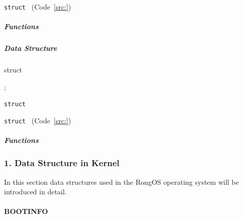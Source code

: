 \documentclass{swfcthesis}
\begin{document}
\texttt{struct } (Code~\ref{src:})

\subparagraph{ Functions}

\begin{description}
  
\item[\texttt{}]
\item[\texttt{}]
  
\end{description}




\subsubsection{}
\label{sec:}


  
\subparagraph{Data Structure}

\paragraph{}

\begin{listing}[H]
  \begin{codeblock}
\begin{ccode}
struct 
{ 
  
};
\end{ccode}
  \end{codeblock}
  \caption{\texttt{struct }}\label{src:}
\end{listing}

\texttt{struct } (Code~\ref{src:})

\subparagraph{ Functions}

\begin{description}
  
\item[\texttt{}]
\item[\texttt{}]
  
\end{description}


\iffalse %
\subsubsection{1. Data Structure in Kernel}
In this section data structures used in the RongOS operating system will be introduced in
detail.

\paragraph{BOOTINFO}
\end{document}
